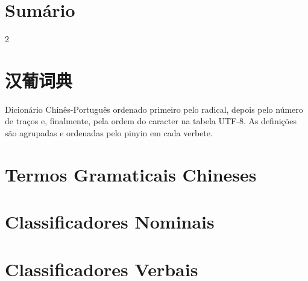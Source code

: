 \documentclass[a4paper,9pt,twoside,openright]{memoir}
\begin{document}



\clearpage
\pagestyle{empty}
\chapter{Sumário}
\begin{multicols}{2}
 \begin{KeepFromToc}
  \renewcommand{\contentsname}{}%
  \tableofcontents
 \end{KeepFromToc}
\end{multicols}

\clearpage
\pagestyle{empty}
\chapter{汉葡词典}

%
%

Dicionário Chinês-Português ordenado primeiro pelo radical,
depois pelo número de traços e, finalmente, pela ordem do
caracter na tabela UTF-8.  As definições são agrupadas e
ordenadas pelo pinyin em cada verbete.

\clearpage
\pagestyle{dictionary}
\ifdraftdoc

\else

\fi

\pagestyle{plain}

\ifdraftdoc
%
%
%
\else

\clearpage
\chapter{Termos Gramaticais Chineses}


\clearpage
\chapter{Classificadores Nominais}


\clearpage
\chapter{Classificadores Verbais}

\end{document}
